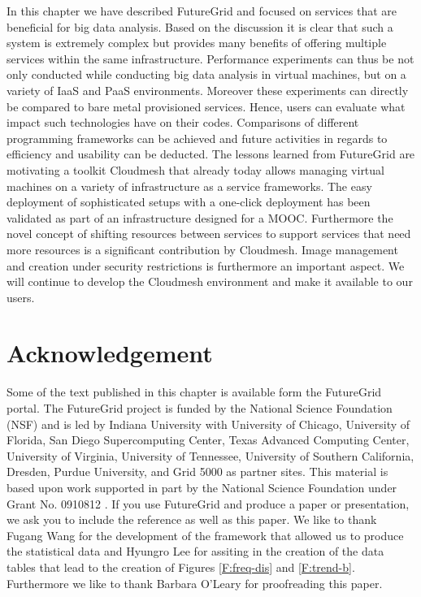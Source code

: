 \documentclass[graybox]{svmult}
\begin{document}
In this chapter we have described FutureGrid and focused on services that are beneficial for big data analysis. Based on the discussion it is clear that such a system is extremely complex but provides many benefits of offering multiple services within the same infrastructure. Performance experiments can thus be not only conducted while conducting big data analysis in virtual machines, but on a variety of IaaS and PaaS environments. Moreover these experiments can directly be compared to bare metal provisioned services. Hence, users can evaluate what impact such technologies have on their codes. Comparisons of different programming frameworks can be achieved and future activities in regards to efficiency and usability can be deducted. The lessons learned from FutureGrid are motivating a toolkit Cloudmesh that already today allows managing virtual machines on a variety of infrastructure as a service frameworks. The easy deployment of sophisticated setups with a one-click deployment has been validated as part of an infrastructure designed for a MOOC. Furthermore the novel concept of shifting resources \cite{las08federated-cloud} between services to support services that need more resources is a significant contribution by Cloudmesh. Image management and creation under security restrictions \cite{fg-1295} is furthermore an important aspect. We will continue to develop the Cloudmesh environment and make it available to our users.




\section*{Acknowledgement}


Some of the text published in this chapter is available form the FutureGrid portal. 
The FutureGrid project is funded by the National Science Foundation (NSF) and is led by Indiana University with University of Chicago, University of Florida, San Diego Supercomputing Center, Texas Advanced Computing Center, University of Virginia, University of Tennessee, University of Southern California, Dresden, Purdue University, and Grid 5000 as partner sites. This material is based upon work supported in part by the National Science Foundation under Grant No. 0910812 \cite{las12fg-bookchapter}. If you use FutureGrid and produce a paper or presentation, we ask you to include the reference \cite{las2010gce,las12fg-bookchapter} as well as this paper. 
We like to thank Fugang Wang for the development of the framework that allowed us to produce the statistical data and  Hyungro Lee for assiting in the creation of the data tables that lead to the creation of Figures \ref{F:freq-dis} and \ref{F:trend-b}. Furthermore we like to thank Barbara O'Leary for proofreading this paper.











%
\end{document}
